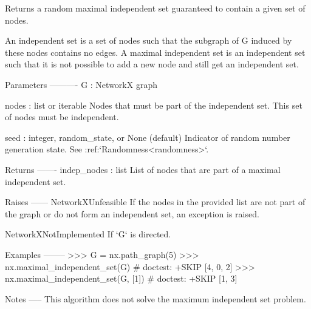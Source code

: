 \begin{DoxyVerb}Returns a random maximal independent set guaranteed to contain
a given set of nodes.

An independent set is a set of nodes such that the subgraph
of G induced by these nodes contains no edges. A maximal
independent set is an independent set such that it is not possible
to add a new node and still get an independent set.

Parameters
----------
G : NetworkX graph

nodes : list or iterable
   Nodes that must be part of the independent set. This set of nodes
   must be independent.

seed : integer, random_state, or None (default)
    Indicator of random number generation state.
    See :ref:`Randomness<randomness>`.

Returns
-------
indep_nodes : list
   List of nodes that are part of a maximal independent set.

Raises
------
NetworkXUnfeasible
   If the nodes in the provided list are not part of the graph or
   do not form an independent set, an exception is raised.

NetworkXNotImplemented
    If `G` is directed.

Examples
--------
>>> G = nx.path_graph(5)
>>> nx.maximal_independent_set(G)  # doctest: +SKIP
[4, 0, 2]
>>> nx.maximal_independent_set(G, [1])  # doctest: +SKIP
[1, 3]

Notes
-----
This algorithm does not solve the maximum independent set problem.\end{DoxyVerb}
 